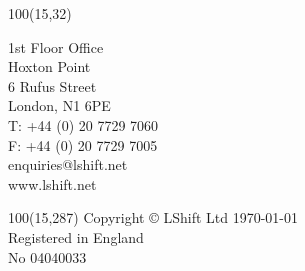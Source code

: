 \rfoot{\textcolor{LShiftBlue}{Technology from back to front}}
\textblockorigin{0mm}{0mm}
\setlength{\TPHorizModule}{1mm}
\setlength{\TPVertModule}{\TPHorizModule}


\begin{textblock}{100}(15,32)
  \begin{small}
    {\color{FrontPageGrey}
      \noindent1st Floor Office\\
      Hoxton Point\\
      6 Rufus Street\\
      London, N1 6PE\\

      \noindent T: +44 (0) 20 7729 7060\\
      F: +44 (0) 20 7729 7005\\
      enquiries@lshift.net\\
      www.lshift.net\\
    }
  \end{small}
\end{textblock}
\begin{textblock}{100}(15,287)
  \small \textcolor{FrontPageGrey}
  {Copyright © LShift Ltd \thisyear\today\\
    Registered in England\\
    No 04040033}
\end{textblock}

\vspace*{10cm}
{\flushleft
  \textcolor{LShiftBlue}{\bf\begin{Huge}\tystrtitle\\\end{Huge}}
  \vspace*{0.4cm}
  \textcolor{SubtitleGrey}{\begin{large}\tystrsubtitle\end{large}}
}
\vspace*{0.4cm}
{\small
  \begin{description}[font=\normalfont,align=right]
  \whendefined{\tystrrecipients}{\item[Recipient(s)] {\bf\tystrrecipients}}
  \whendefined{\tystrproject}{\item[Project] {\bf\tystrproject}}
  \whendefined{\tystrversion}{\item[Version] {\bf\tystrversion}}
  \whendefined{\tystrdate}{\item[Date] {\bf\tystrdate}}
  \whendefined{\tystrauthor}{\item[Author(s)] {\bf\tystrauthor}}
  \item[]{}
  \end{description}

}

